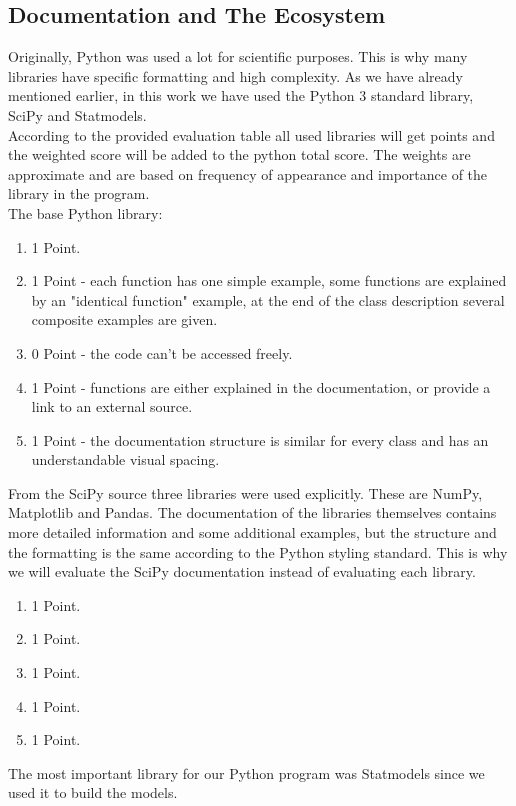 \documentclass[
  twoside,
  11pt, a4paper,
  footinclude=true,
  headinclude=true,
  cleardoublepage=empty
]{scrreprt}
\begin{document}
    \subsection{Documentation and The Ecosystem}
    Originally, Python was used a lot for scientific purposes. This is why many libraries have specific formatting and high complexity. As we have already mentioned earlier, in this work we have used the Python 3 standard library,  SciPy and Statmodels.\\
    According to the provided evaluation table all used libraries will get points and the weighted score will be added to the python total score. The weights are approximate and are based on frequency of appearance and importance of the library in the program.\\
    The base Python library:
    \begin{enumerate}
        \item 1 Point.
        \item 1 Point - each function has one simple example, some functions are explained by an "identical function" example, at the end of the class description several composite examples are given.
        \item 0 Point - the code can't be accessed freely.
        \item 1 Point - functions are either explained in the documentation, or provide a link to an external source.
        \item 1 Point - the documentation structure is similar for every class and has an understandable visual spacing.
    \end{enumerate}
    From the SciPy source three libraries were used explicitly. These are NumPy, Matplotlib and Pandas. The documentation of the libraries themselves contains more detailed information and some additional examples, but the structure and the formatting is the same according to the Python styling standard. This is why we will evaluate the SciPy documentation instead of evaluating each library.
    \begin{enumerate}
        \item 1 Point.
        \item 1 Point.
        \item 1 Point.
        \item 1 Point.
        \item 1 Point.
    \end{enumerate}
    The most important library for our Python program was Statmodels since we used it to build the models.
\end{document}
